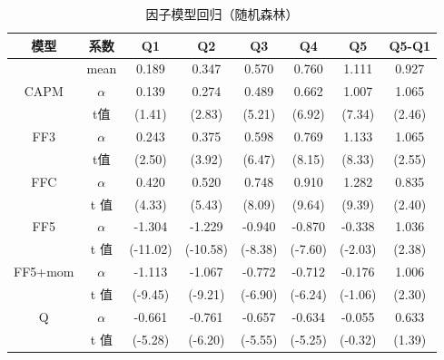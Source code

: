 \begin{table}[htbp]
\caption{因子模型回归（随机森林）}
\label{factor1}
\begin{tabular*}{\hsize}{@{\hskip\tabcolsep\extracolsep\fill}*{8}{c}}
\toprule
模型                       & 系数                    & Q1 & Q2 & Q3 & Q4 & Q5 & Q5-Q1 \\ \midrule
 & mean& 0.189&   0.347& 0.570&  0.760&   1.111& 0.927\\
 \multirow{2}{*}{CAPM}     & $\alpha$ &     0.139         &    0.274&    0.489&    0.662&    1.007&    1.065         \\
                         & t值                     &    (1.41)         &   (2.83)         &   (5.21)         &   (6.92)         &   (7.34)          &   (2.46)        \\
\multirow{2}{*}{FF3}     & $\alpha$ &     0.243&    0.375&    0.598&    0.769&    1.133&    1.065         \\
                         & t值                     &     (2.50)         &   (3.92)         &   (6.47)         &   (8.15)         &   (8.33)          &   (2.55)        \\
\multirow{2}{*}{FFC}     & $\alpha$  &   0.420&    0.520&    0.748&    0.910&    1.282&    0.835    \\
                         & t 值                   &    (4.33)         &   (5.43)         &   (8.09)         &   (9.64)         &   (9.39)           &   (2.40)           \\
\multirow{2}{*}{FF5}     &$\alpha$  & -1.304&   -1.229&   -0.940&   -0.870&   -0.338&    1.036   \\
                         & t  值                   &    (-11.02)         & (-10.58)         &  (-8.38)         &  (-7.60)         &  (-2.03)     &   (2.38)         \\
\multirow{2}{*}{FF5+mom} &$\alpha$  & -1.113&   -1.067&   -0.772&   -0.712&   -0.176       &    1.006    \\
                         & t  值                   &  (-9.45)         &  (-9.21)         &  (-6.90)         &  (-6.24)         &  (-1.06)       &   (2.30)       \\
\multirow{2}{*}{Q}       &$\alpha$  & -0.661&   -0.761&   -0.657&   -0.634&  -0.055   &    0.633         \\
                         & t   值                  &    (-5.28)         &  (-6.20)         &  (-5.55)         &  (-5.25)         &  (-0.32)      &   (1.39)     \\ \bottomrule
\end{tabular*}
\end{table}

